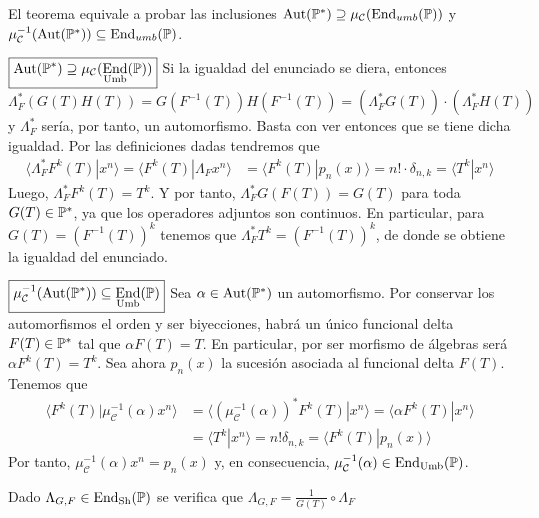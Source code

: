 \begin{demo}
    El teorema equivale a probar las inclusiones $\operatorname*{Aut}(\mathbb{P}^*) \supseteq \mu_{\mathcal{C}}(\operatorname*{End}_{umb}(\mathbb{P}))$ y $\mu_{\mathcal{C}}^{-1}(\operatorname*{Aut}(\mathbb{P}^*)) \subseteq \operatorname*{End}_{umb}(\mathbb{P})$.

    $\boxed{\operatorname*{Aut}(\mathbb{P}^*) \supseteq \mu_{\mathcal{C}}(\operatorname*{End}_{\mathrm{Umb}}(\mathbb{P}))}$ Si la igualdad del enunciado se diera, entonces
    \begin{equation*}
        \Lambda_{F}^*(G(T)H(T)) = G(F^{-1}(T))H(F^{-1}(T)) = (\Lambda^*_{F}G(T))\cdot (\Lambda^*_{F}H(T)) 
    \end{equation*}
    y $\Lambda_{F}^*$ sería, por tanto, un automorfismo. Basta con ver entonces que se tiene dicha igualdad. Por las definiciones dadas tendremos que 
\begin{align*}
    \langle \Lambda_{F}^* F^k(T)| x^n\rangle =  \langle F^k(T) | \Lambda_{F} x^n\rangle & =  \langle F^k(T) | p_n(x)\rangle = n! \cdot \delta_{n,k} = \langle T^k | x^n \rangle
\end{align*}
Luego, $\Lambda_{F}^* F^k(T) =T^k$. Y por tanto, $\Lambda_{F}^*G(F(T)) = G(T)$ para toda $G(T) \in \mathbb{P}^*$, ya que los operadores adjuntos son continuos. En particular, para $G(T) = (F^{-1}(T))^k$ tenemos que $\Lambda_{F}^*T^k = (F^{-1}(T))^k$, de donde se obtiene la igualdad del enunciado. 

$\boxed{\mu_{\mathcal{C}}^{-1}(\operatorname*{Aut}(\mathbb{P}^*)) \subseteq \operatorname*{End}_{\mathrm{Umb}}(\mathbb{P})}$ Sea $\alpha \in \operatorname*{Aut}(\mathbb{P}^*)$ un automorfismo. Por conservar los automorfismos el orden y ser biyecciones, habrá un único funcional delta $F(T) \in \mathbb{P}^*$ tal que $\alpha F(T) = T$. En particular, por ser morfismo de álgebras será $\alpha F^k(T) = T^k$. Sea ahora $p_n(x)$ la sucesión asociada al funcional delta $F(T)$. Tenemos que
\begin{align*}
    \langle F^k(T) | \mu_{\mathcal{C}}^{-1}(\alpha) x^n \rangle & = \langle (\mu_{\mathcal{C}}^{-1}(\alpha))^* F^k(T) | x^n \rangle = \langle \alpha F^k(T) | x^n \rangle\\
    & = \langle T^k | x^n \rangle = n! \delta_{n,k} = \langle F^k(T) | p_n(x) \rangle
\end{align*}
Por tanto, $\mu_{\mathcal{C}}^{-1}(\alpha) x^n = p_n(x)$ y, en consecuencia, $\mu_{\mathcal{C}}^{-1}(\alpha) \in \operatorname*{End}_{\mathrm{Umb}}(\mathbb{P})$.
\end{demo}

\begin{proposicion}
    Dado $\Lambda_{G,F} \in \operatorname*{End}_{\mathrm{Sh}}(\mathbb{P})$ se verifica que $\Lambda_{G,F} = \frac{1}{G(T)} \circ \Lambda_{F}$
\end{proposicion}


